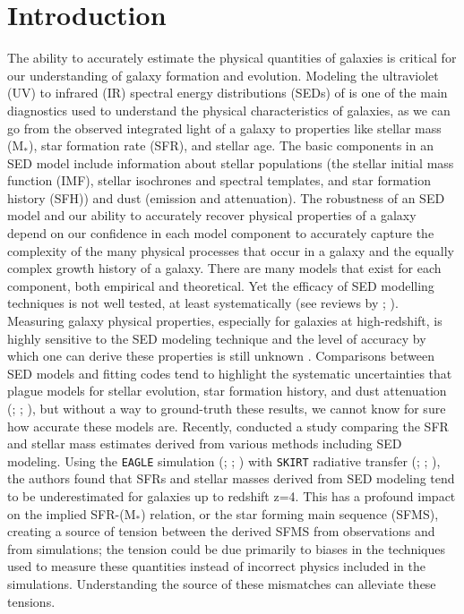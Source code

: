 \documentclass[twocolumn]{aastex62}
\begin{document}
\section{Introduction} \label{sec:intro}

The ability to accurately estimate the physical quantities of galaxies is critical for our understanding of galaxy formation and evolution. Modeling the ultraviolet (UV) to infrared (IR) spectral energy distributions (SEDs) of is one of the main diagnostics used to understand the physical characteristics of galaxies, as we can go from the observed integrated light of a galaxy to properties like stellar mass (M$_*$), star formation rate (SFR), and stellar age. The basic components in an SED model include information about stellar populations (the stellar initial mass function (IMF), stellar isochrones and spectral templates, and star formation history (SFH)) and dust (emission and attenuation). The robustness of an SED model and our ability to accurately
recover physical properties of a galaxy depend on our confidence in each model component to accurately capture the complexity of the many physical processes that occur in a galaxy and the equally complex growth history of a galaxy. There are many models that exist for each component, both empirical and theoretical. Yet the efficacy of SED modelling techniques is not well tested, at least systematically (see reviews by \cite{conroy_modeling_2013}; \cite{walcher_fitting_2011}). Measuring galaxy physical properties, especially for galaxies at high-redshift, is highly sensitive to the SED modeling technique and the level of accuracy by which one can derive these properties is still unknown \citep{hayward_should_2015}. Comparisons between SED models and fitting codes tend to highlight the systematic uncertainties that plague models for stellar evolution, star formation history, and dust attenuation (\cite{hunt_comprehensive_2019}; \cite{mitchell_how_2013}; \cite{pforr_recovering_2012}), but without a way to ground-truth these results, we cannot know for sure how accurate these models are. Recently, \cite{katsianis_high_2020} conducted a study comparing the SFR and stellar mass estimates derived from various methods including SED modeling. Using the \texttt{EAGLE} simulation (\cite{schaye_eagle_2015}; \cite{crain_eagle_2015}; \cite{mcalpine_eagle_2016}) with \texttt{SKIRT} radiative transfer (\cite{baes_radiative_2003}; \cite{baes_efficient_2011}; \cite{camps_skirt_2015}), the authors found that SFRs and stellar masses derived from SED modeling tend to be underestimated for galaxies up to redshift z=4. This has a profound impact on the implied SFR-(M$_*$) relation, or the star forming main sequence (SFMS), creating a source of tension between the derived SFMS from observations and from simulations; the tension could be due primarily to biases in the techniques used to measure these quantities instead of incorrect physics included in the simulations. Understanding the source of these mismatches can alleviate these tensions. 
\end{document}
